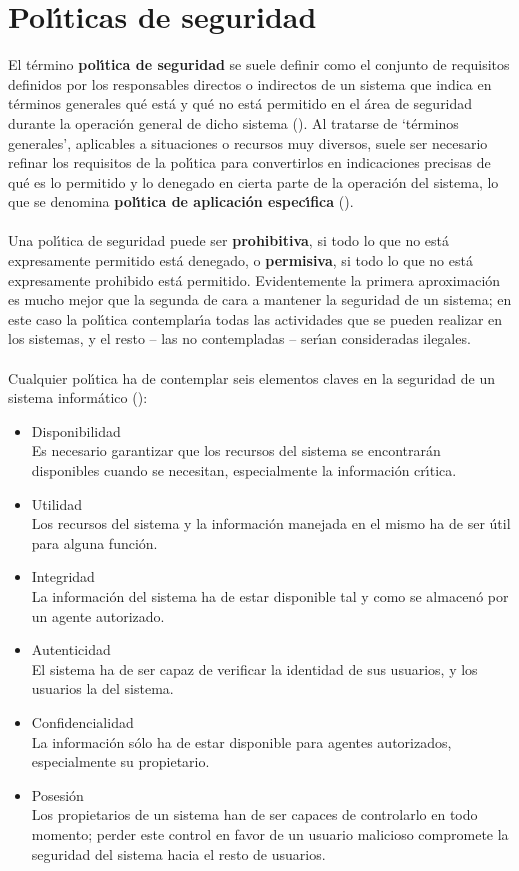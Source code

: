 \section{Pol\'{\i}ticas de seguridad}
El t\'ermino {\bf pol\'{\i}tica de seguridad} se suele definir como el 
conjunto de requisitos definidos por los responsables directos o indirectos
de un sistema que indica en t\'erminos generales qu\'e est\'a y qu\'e no est\'a
permitido en el \'area de seguridad durante la operaci\'on general de dicho
sistema (\cite{kn:iso88}). Al tratarse de `t\'erminos generales', aplicables
a situaciones o recursos muy diversos, suele ser necesario refinar los 
requisitos de la pol\'{\i}tica para convertirlos en indicaciones precisas
de qu\'e es lo permitido y lo denegado en cierta parte de la operaci\'on del 
sistema, lo que se denomina {\bf pol\'{\i}tica de aplicaci\'on espec\'{\i}fica} 
(\cite{kn:muf93}).\\
\\Una pol\'{\i}tica de seguridad puede ser {\bf prohibitiva}, si todo lo que
no est\'a expresamente permitido est\'a denegado, o {\bf permisiva}, si todo
lo que no est\'a expresamente prohibido est\'a permitido. Evidentemente la
primera aproximaci\'on es mucho mejor que la segunda de cara a mantener la
seguridad de un sistema; en este caso la pol\'{\i}tica contemplar\'{\i}a todas
las actividades que se pueden realizar en los sistemas, y el resto -- las no
contempladas -- ser\'{\i}an consideradas ilegales.\\
\\Cualquier pol\'{\i}tica ha de contemplar seis elementos claves en la seguridad
de un sistema inform\'atico (\cite{kn:par94}):
\begin{itemize}
\item Disponibilidad\\
Es necesario garantizar que los recursos del sistema se encontrar\'an 
disponibles cuando se necesitan, especialmente la informaci\'on cr\'{\i}tica.
\item Utilidad\\
Los recursos del sistema y la informaci\'on manejada en el mismo ha de ser 
\'util para alguna funci\'on.
\item Integridad\\
La informaci\'on del sistema ha de estar disponible tal y como se almacen\'o
por un agente autorizado.
\item Autenticidad\\
El sistema ha de ser capaz de verificar la identidad de sus usuarios, y los 
usuarios la del sistema.
\item Confidencialidad\\
La informaci\'on s\'olo ha de estar disponible para agentes autorizados, 
especialmente su propietario.
\item Posesi\'on\\
Los propietarios de un sistema han de ser capaces de controlarlo en todo 
momento; perder este control en favor de un usuario malicioso compromete la
seguridad del sistema hacia el resto de usuarios.
\end{itemize}
